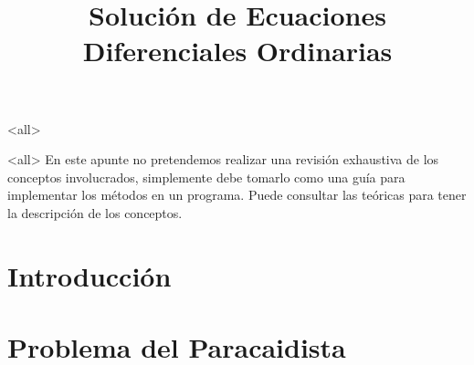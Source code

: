 \mode<all>









\title{
   Solución de Ecuaciones Diferenciales Ordinarias }
\subject{ Métodos de Euler y de Runge-Kutta}





\mode<all>
En este apunte no pretendemos realizar una revisión exhaustiva de los conceptos involucrados, 
simplemente debe tomarlo como una guía para implementar los métodos en un programa. Puede consultar
las teóricas para tener la descripción de los conceptos.

\section{Introducción}


\section{Problema del Paracaidista}

%
